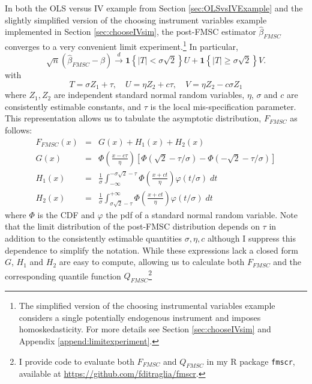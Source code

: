 In both the OLS versus IV example from Section \ref{sec:OLSvsIVExample} and the slightly simplified version of the choosing instrument variables example implemented in Section \ref{sec:chooseIVsim}, the post-FMSC estimator $\widehat{\beta}_{FMSC}$ converges to a very convenient limit experiment.\footnote{The simplified version of the choosing instrumental variables example considers a single potentially endogenous instrument and imposes homoskedasticity.
  For more details see Section \ref{sec:chooseIVsim} and Appendix \ref{append:limitexperiment}.}
In particular, 
\begin{equation}
  \sqrt{n}(\widehat{\beta}_{FMSC} - \beta) \overset{d}{\rightarrow}  \mathbf{1}\left\{ |T|<\sigma \sqrt{2} \right\} U +  \mathbf{1}\left\{ |T|\geq\sigma \sqrt{2} \right\} V.
  \label{eq:FMSCLimitExperiment}
\end{equation}
with
\begin{equation}
  T = \sigma Z_1 + \tau, \quad
  U = \eta Z_2 + c\tau, \quad
  V = \eta Z_2 - c\sigma Z_1
\end{equation}
where $Z_1, Z_2$ are independent standard normal random variables, $\eta$, $\sigma$ and $c$ are consistently estimable constants, and $\tau$ is the local mis-specification parameter.
This representation allows us to tabulate the asymptotic distribution, $F_{FMSC}$ as follows: 
\begin{eqnarray}
  F_{FMSC}(x) &=& G(x) + H_1(x) + H_2(x) \\
  \label{eq:FFMSC}
  G(x) &=& \Phi\left( \frac{x - c\tau}{\eta} \right)\left[ \Phi( \sqrt{2} - \tau/\sigma) -  \Phi( -\sqrt{2} - \tau/\sigma )\right]\\
  \label{eq:GFMSC}
  H_1(x) &=& \frac{1}{\sigma}\int_{-\infty}^{-\sigma\sqrt{2} - \tau} \Phi\left( \frac{x + ct}{\eta}\right)\varphi(t/\sigma)\; dt\\
  \label{eq:H1FMSC}
  H_2(x) &=& \frac{1}{\sigma}\int^{+\infty}_{\sigma\sqrt{2} - \tau} \Phi\left( \frac{x + ct}{\eta}\right)\varphi(t/\sigma)\; dt
  \label{eq:H2FMSC}
\end{eqnarray}
where $\Phi$ is the CDF and $\varphi$ the pdf of a standard normal random variable.
Note that the limit distribution of the post-FMSC distribution depends on $\tau$ in addition to the consistently estimable quantities $\sigma, \eta, c$ although I suppress this dependence to simplify the notation.
While these expressions lack a closed form $G$, $H_1$ and $H_2$ are easy to compute, allowing us to calculate both $F_{FMSC}$ and the corresponding quantile function $Q_{FMSC}$\footnote{I provide code to evaluate both $F_{FMSC}$ and $Q_{FMSC}$ in my R package \texttt{fmscr}, available at \url{https://github.com/fditraglia/fmscr}.}

